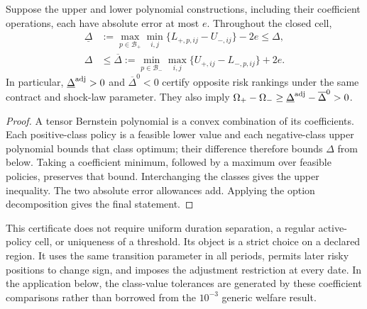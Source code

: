\begin{proposition}
\label{prop:r7_tensor}
Suppose the upper and lower polynomial constructions, including their coefficient operations, each have absolute error at most $e$. Throughout the closed cell,
\begin{align}
 \underline\Delta&:=\max_{p\in\mathcal B_+}\min_{i,j}
   \{L_{+,p,ij}-U_{-,ij}\}-2e\leq\Delta,\label{eq:r7_tensor_sign}\\
 \Delta&\leq\overline\Delta:=\min_{p\in\mathcal B_-}\max_{i,j}
   \{U_{+,ij}-L_{-,p,ij}\}+2e.\nonumber
\end{align}
In particular, $\underline\Delta^{\rm adj}>0$ and $\overline\Delta^0<0$ certify opposite risk rankings under the same contract and shock-law parameter. They also imply
$\Omega_+-\Omega_-\geq\underline\Delta^{\rm adj}-\overline\Delta^0>0$.
\end{proposition}
\begin{proof}
A tensor Bernstein polynomial is a convex combination of its coefficients. Each positive-class policy is a feasible lower value and each negative-class upper polynomial bounds that class optimum; their difference therefore bounds $\Delta$ from below. Taking a coefficient minimum, followed by a maximum over feasible policies, preserves that bound. Interchanging the classes gives the upper inequality. The two absolute error allowances add. Applying the option decomposition gives the final statement.
\end{proof}

This certificate does not require uniform duration separation, a regular active-policy cell, or uniqueness of a threshold. Its object is a strict choice on a declared region. It uses the same transition parameter in all periods, permits later risky positions to change sign, and imposes the adjustment restriction at every date. In the application below, the class-value tolerances are generated by these coefficient comparisons rather than borrowed from the $10^{-3}$ generic welfare result.
